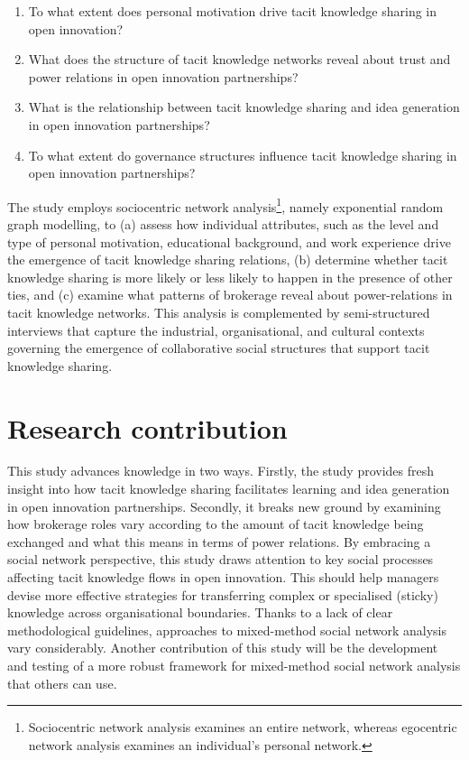     \begin{enumerate}
        \item To what extent does personal motivation drive tacit knowledge sharing in open innovation?
	    \item What does the structure of tacit knowledge networks reveal about trust and power relations in open innovation partnerships?
	    \item What is the relationship between tacit knowledge sharing and idea generation in open innovation partnerships?
	    \item To what extent do governance structures influence tacit knowledge sharing in open innovation partnerships?
    \end{enumerate}

The study employs sociocentric network analysis\footnote{Sociocentric network analysis examines an entire network, whereas egocentric network analysis examines an individual's personal network.}, namely exponential random graph modelling, to (a) assess how individual attributes, such as the level and type of personal motivation, educational background, and work experience drive the emergence of tacit knowledge sharing relations, (b) determine whether tacit knowledge sharing is more likely or less likely to happen in the presence of other ties, and (c) examine what patterns of brokerage reveal about power-relations in tacit knowledge networks. This analysis is complemented by semi\hyp{}structured interviews that capture the industrial, organisational, and cultural contexts governing the emergence of collaborative social structures that support tacit knowledge sharing. \medskip  

\section{Research contribution}

This study advances knowledge in two ways. Firstly, the study provides fresh insight into how tacit knowledge sharing facilitates learning and idea generation in open innovation partnerships. Secondly, it breaks new ground by examining how brokerage roles vary according to the amount of tacit knowledge being exchanged and what this means in terms of power relations. By embracing a social network perspective, this study draws attention to key social processes affecting tacit knowledge flows in open innovation. This should help managers devise more effective strategies for transferring complex or specialised (sticky) knowledge across organisational boundaries. Thanks to a lack of clear methodological guidelines, approaches to mixed\hyp{}method social network analysis vary considerably. Another contribution of this study will be the development and testing of a more robust framework for mixed\hyp{}method social network analysis that others can use.    \medskip

